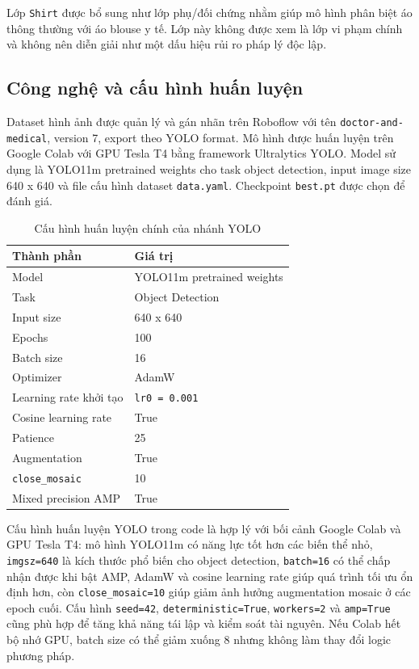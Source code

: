 Lớp \texttt{Shirt} được bổ sung như lớp phụ/đối chứng nhằm giúp mô hình phân biệt áo thông thường với áo blouse y tế. Lớp này không được xem là lớp vi phạm chính và không nên diễn giải như một dấu hiệu rủi ro pháp lý độc lập.

\subsection{Công nghệ và cấu hình huấn luyện}
Dataset hình ảnh được quản lý và gán nhãn trên Roboflow với tên \texttt{doctor-and-medical}, version 7, export theo YOLO format. Mô hình được huấn luyện trên Google Colab với GPU Tesla T4 bằng framework Ultralytics YOLO. Model sử dụng là YOLO11m pretrained weights cho task object detection, input image size 640 x 640 và file cấu hình dataset \texttt{data.yaml}. Checkpoint \texttt{best.pt} được chọn để đánh giá.

\begin{table}[H]
\centering
\caption{Cấu hình huấn luyện chính của nhánh YOLO}
\label{tab:yolo_training_config}
\begin{tabularx}{\textwidth}{|L{0.34\textwidth}|Y|}
\hline
\textbf{Thành phần} & \textbf{Giá trị} \\
\hline
Model & YOLO11m pretrained weights \\ \hline
Task & Object Detection \\ \hline
Input size & 640 x 640 \\ \hline
Epochs & 100 \\ \hline
Batch size & 16 \\ \hline
Optimizer & AdamW \\ \hline
Learning rate khởi tạo & \texttt{lr0 = 0.001} \\ \hline
Cosine learning rate & True \\ \hline
Patience & 25 \\ \hline
Augmentation & True \\ \hline
\texttt{close\_mosaic} & 10 \\ \hline
Mixed precision AMP & True \\ \hline
\end{tabularx}
\end{table}

Cấu hình huấn luyện YOLO trong code là hợp lý với bối cảnh Google Colab và GPU Tesla T4: mô hình YOLO11m có năng lực tốt hơn các biến thể nhỏ, \texttt{imgsz=640} là kích thước phổ biến cho object detection, \texttt{batch=16} có thể chấp nhận được khi bật AMP, AdamW và cosine learning rate giúp quá trình tối ưu ổn định hơn, còn \texttt{close\_mosaic=10} giúp giảm ảnh hưởng augmentation mosaic ở các epoch cuối. Cấu hình \texttt{seed=42}, \texttt{deterministic=True}, \texttt{workers=2} và \texttt{amp=True} cũng phù hợp để tăng khả năng tái lập và kiểm soát tài nguyên. Nếu Colab hết bộ nhớ GPU, batch size có thể giảm xuống 8 nhưng không làm thay đổi logic phương pháp.

